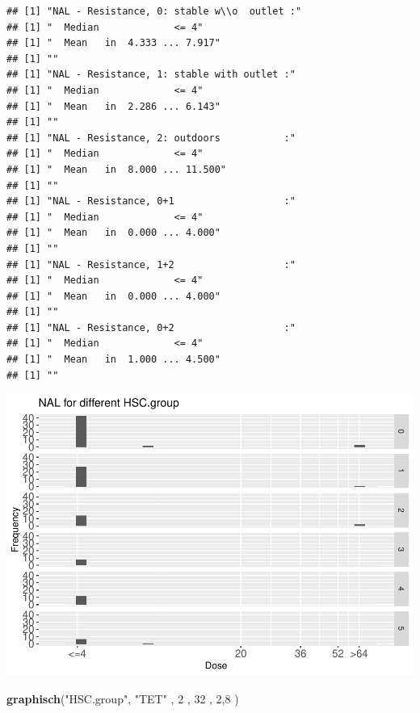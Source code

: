 \documentclass[
]{article}
\newenvironment{Shaded}{\begin{snugshade}}{\end{snugshade}}
\newcommand{\DecValTok}[1]{\textcolor[rgb]{0.00,0.00,0.81}{#1}}
\newcommand{\KeywordTok}[1]{\textcolor[rgb]{0.13,0.29,0.53}{\textbf{#1}}}
\newcommand{\NormalTok}[1]{#1}
\newcommand{\StringTok}[1]{\textcolor[rgb]{0.31,0.60,0.02}{#1}}
\begin{document}
\begin{verbatim}
## [1] "NAL - Resistance, 0: stable w\\o  outlet :"
## [1] "  Median             <= 4"
## [1] "  Mean   in  4.333 ... 7.917"
## [1] ""
## [1] "NAL - Resistance, 1: stable with outlet :"
## [1] "  Median             <= 4"
## [1] "  Mean   in  2.286 ... 6.143"
## [1] ""
## [1] "NAL - Resistance, 2: outdoors           :"
## [1] "  Median             <= 4"
## [1] "  Mean   in  8.000 ... 11.500"
## [1] ""
## [1] "NAL - Resistance, 0+1                   :"
## [1] "  Median             <= 4"
## [1] "  Mean   in  0.000 ... 4.000"
## [1] ""
## [1] "NAL - Resistance, 1+2                   :"
## [1] "  Median             <= 4"
## [1] "  Mean   in  0.000 ... 4.000"
## [1] ""
## [1] "NAL - Resistance, 0+2                   :"
## [1] "  Median             <= 4"
## [1] "  Mean   in  1.000 ... 4.500"
## [1] ""
\end{verbatim}

\includegraphics{Verteilungen_files/figure-latex/unnamed-chunk-53-1.pdf}

\begin{Shaded}
\begin{Highlighting}[]
   \KeywordTok{graphisch}\NormalTok{(}\StringTok{"HSC.group"}\NormalTok{, }\StringTok{"TET"}\NormalTok{ , }\DecValTok{2}\NormalTok{    ,  }\DecValTok{32}\NormalTok{   ,   }\DecValTok{2}\NormalTok{,}\DecValTok{8}\NormalTok{    ) }
\end{Highlighting}
\end{Shaded}
\end{document}
